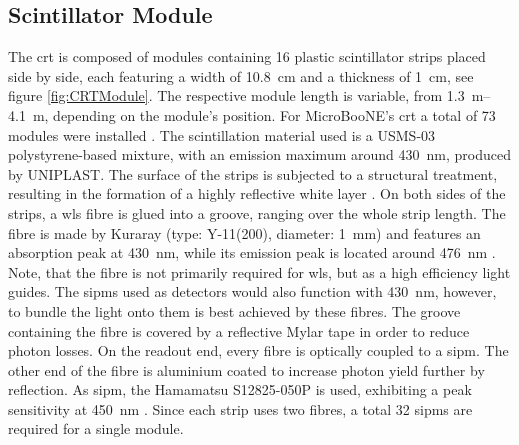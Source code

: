 \subsection{Scintillator Module}
The \gls{crt} is composed of modules containing \num{16} plastic scintillator strips placed side by side, each featuring a width of \SI{10.8}{\centi\metre} and a thickness of \SI{1}{\centi\metre}, see figure \ref{fig:CRTModule}. The respective module length is variable, from \SIrange{1.3}{4.1}{\metre}, depending on the module's position. For MicroBooNE's \gls{crt} a total of \num{73} modules were installed \cite{MicroBooNECRT}. The scintillation material used is a USMS-03 polystyrene-based mixture, with an emission maximum around \SI{430}{\nano\metre}, produced by UNIPLAST. The surface of the strips is subjected to a structural treatment, resulting in the formation of a highly reflective white layer \cite{CRTGeneral}. On both sides of the strips, a \gls{wls} fibre is glued into a groove, ranging over the whole strip length. The fibre is made by Kuraray (type: Y-11(200), diameter: \SI{1}{\milli\metre}) and features an absorption peak at \SI{430}{\nano\metre}, while its emission peak is located around \SI{476}{\nano\metre} \cite{CRTFibreSpecs}. Note, that the fibre is not primarily required for \gls{wls}, but as a high efficiency light guides. The \glspl{sipm} used as detectors would also function with \SI{430}{\nano\metre}, however, to bundle the light onto them is best achieved by these fibres. The groove containing the fibre is covered by a reflective Mylar tape in order to reduce photon losses. On the readout end, every fibre is optically coupled to a \gls{sipm}. The other end of the fibre is aluminium coated to increase photon yield further by reflection. As \gls{sipm}, the Hamamatsu S12825-050P is used, exhibiting a peak sensitivity at \SI{450}{\nano\metre} \cite{CRTGeneral}. Since each strip uses two fibres, a total \num{32} \glspl{sipm} are required for a single module.

